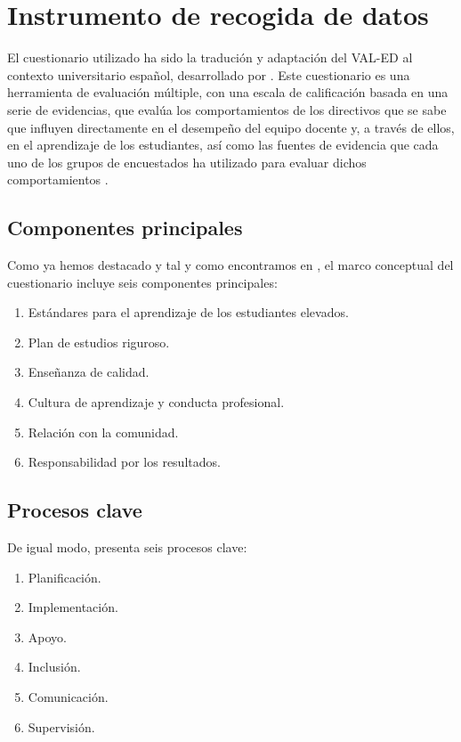 \documentclass[spanish]{textolivre}
\begin{document}
\section{Instrumento de recogida de datos}
El cuestionario utilizado ha sido la tradución y adaptación del VAL-ED al contexto universitario español, desarrollado por \textcite{palomino2023}. Este cuestionario es una herramienta de evaluación múltiple, con una escala de calificación basada en una serie de evidencias, que evalúa los comportamientos de los directivos que se sabe que influyen directamente en el desempeño del equipo docente y, a través de ellos, en el aprendizaje de los estudiantes, así como las fuentes de evidencia que cada uno de los grupos de encuestados ha utilizado para evaluar dichos comportamientos \cite{vanderhandbook}.


\subsection{Componentes principales}
Como ya hemos destacado y tal y como encontramos en \textcite{porter2008vanderbilt}, el marco conceptual del cuestionario incluye seis componentes principales:

\begin{enumerate}
 \item Estándares para el aprendizaje de los estudiantes elevados.
 \item Plan de estudios riguroso.
 \item Enseñanza de calidad.
 \item Cultura de aprendizaje y conducta profesional.
 \item Relación con la comunidad.
 \item Responsabilidad por los resultados. 
\end{enumerate}

\subsection{Procesos clave}
De igual modo, presenta seis procesos clave:

\begin{enumerate}
 \item Planificación.
 \item Implementación.
 \item Apoyo.
 \item Inclusión.
 \item Comunicación.
 \item Supervisión.
\end{enumerate}
\end{document}
